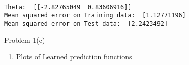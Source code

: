 \documentclass[11pt]{article}
\providecommand{\tightlist}{%
      \setlength{\itemsep}{0pt}\setlength{\parskip}{0pt}}
\begin{document}
    \begin{center}
    \end{center}
    { \hspace*{\fill} \\}
    
    \begin{Verbatim}[commandchars=\\\{\}]
Theta:  [[-2.82765049  0.83606916]]
Mean squared error on Training data:  [1.12771196]
Mean squared error on Test data:  [2.2423492]

    \end{Verbatim}

    Problem 1(c)

    \begin{enumerate}
\def\labelenumi{\arabic{enumi})}
\tightlist
\item
  Plots of Learned prediction functions
\end{enumerate}
\end{document}
